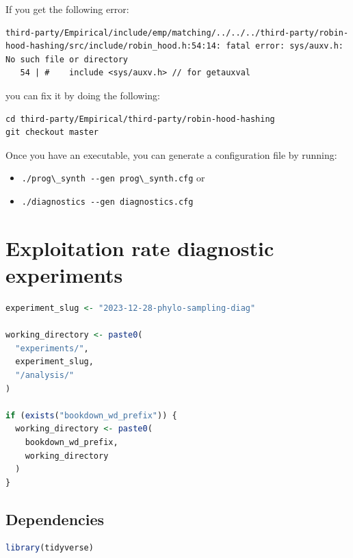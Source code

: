 \documentclass[
]{book}
\newcommand{\passthrough}[1]{#1}
\providecommand{\tightlist}{%
  \setlength{\itemsep}{0pt}\setlength{\parskip}{0pt}}
\begin{document}
If you get the following error:

\begin{lstlisting}
third-party/Empirical/include/emp/matching/../../../third-party/robin-hood-hashing/src/include/robin_hood.h:54:14: fatal error: sys/auxv.h: No such file or directory
   54 | #    include <sys/auxv.h> // for getauxval
\end{lstlisting}

you can fix it by doing the following:

\begin{lstlisting}
cd third-party/Empirical/third-party/robin-hood-hashing
git checkout master
\end{lstlisting}

Once you have an executable, you can generate a configuration file by running:

\begin{itemize}
\tightlist
\item
  \passthrough{\lstinline!./prog\_synth --gen prog\_synth.cfg!} or
\item
  \passthrough{\lstinline!./diagnostics --gen diagnostics.cfg!}
\end{itemize}

\hypertarget{exploitation-rate-diagnostic-experiments}{%
\chapter{Exploitation rate diagnostic experiments}\label{exploitation-rate-diagnostic-experiments}}

\begin{lstlisting}[language=R]
experiment_slug <- "2023-12-28-phylo-sampling-diag"

working_directory <- paste0(
  "experiments/",
  experiment_slug,
  "/analysis/"
)

if (exists("bookdown_wd_prefix")) {
  working_directory <- paste0(
    bookdown_wd_prefix,
    working_directory
  )
}
\end{lstlisting}

\hypertarget{dependencies}{%
\section{Dependencies}\label{dependencies}}

\begin{lstlisting}[language=R]
library(tidyverse)
\end{lstlisting}
\end{document}
